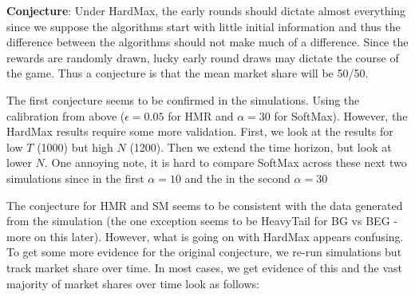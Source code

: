 \documentclass[11pt,letterpaper]{article}
\begin{document}
\textbf{Conjecture}: Under HardMax, the early rounds should dictate almost everything since we suppose the algorithms start with little initial information and thus the difference between the algorithms should not make much of a difference. Since the rewards are randomly drawn, lucky early round draws may dictate the course of the game. Thus a conjecture is that the mean market share will be 50/50.

The first conjecture seems to be confirmed in the simulations. Using the calibration from above ($\epsilon = 0.05$ for HMR and $\alpha = 30$ for SoftMax). However, the HardMax results require some more validation. First, we look at the results for low $T$ (1000) but high $N$ (1200). Then we extend the time horizon, but look at lower $N$. One annoying note, it is hard to compare SoftMax across these next two simulations since in the first $\alpha = 10$ and the in the second $\alpha = 30$





The conjecture for HMR and SM seems to be consistent with the data generated from the simulation (the one exception seems to be HeavyTail for BG vs BEG - more on this later). However, what is going on with HardMax appears confusing. To get some more evidence for the original conjecture, we re-run simulations but track market share over time. In most cases, we get evidence of this and the vast majority of market shares over time look as follows:
\end{document}
